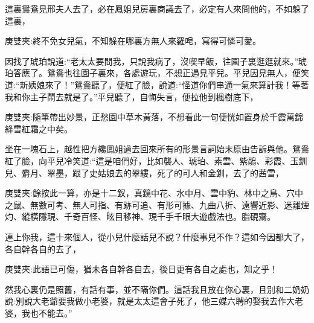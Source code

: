 \begin{parag}
    這裏鴛鴦見邢夫人去了，必在鳳姐兒房裏商議去了，必定有人來問他的，不如躲了這裏，\begin{note}庚雙夾:終不免女兒氣，不知躲在哪裏方無人來羅唣，寫得可憐可愛。\end{note}因找了琥珀說道:“老太太要問我，只說我病了，沒喫早飯，往園子裏逛逛就來。”琥珀答應了。鴛鴦也往園子裏來，各處遊玩，不想正遇見平兒。平兒因見無人，便笑道:“新姨娘來了！”鴛鴦聽了，便紅了臉，說道:“怪道你們串通一氣來算計我！等著我和你主子鬧去就是了。”平兒聽了，自悔失言，便拉他到楓樹底下，\begin{note}庚雙夾:隨筆帶出妙景，正愁園中草木黃落，不想看此一句便恍如置身於千霞萬錦絳雪紅霜之中矣。\end{note}坐在一塊石上，越性把方纔鳳姐過去回來所有的形景言詞始末原由告訴與他。鴛鴦紅了臉，向平兒冷笑道:“這是咱們好，比如襲人、琥珀、素雲、紫鵑、彩霞、玉釧兒、麝月、翠墨，跟了史姑娘去的翠縷，死了的可人和金釧，去了的茜雪，\begin{note}庚雙夾:餘按此一算，亦是十二釵，真鏡中花、水中月、雲中豹、林中之鳥、穴中之鼠、無數可考、無人可指、有跡可追、有形可據、九曲八折、遠響近影、迷離煙灼、縱橫隱現、千奇百怪、眩目移神、現千手千眼大遊戲法也。脂硯齋。\end{note}連上你我，這十來個人，從小兒什麼話兒不說？什麼事兒不作？這如今因都大了，各自幹各自的去了，\begin{note}庚雙夾:此語已可傷，猶未各自幹各自去，後日更有各自之處也，知之乎！\end{note}然我心裏仍是照舊，有話有事，並不瞞你們。這話我且放在你心裏，且別和二奶奶說:別說大老爺要我做小老婆，就是太太這會子死了，他三媒六聘的娶我去作大老婆，我也不能去。”
\end{parag}


